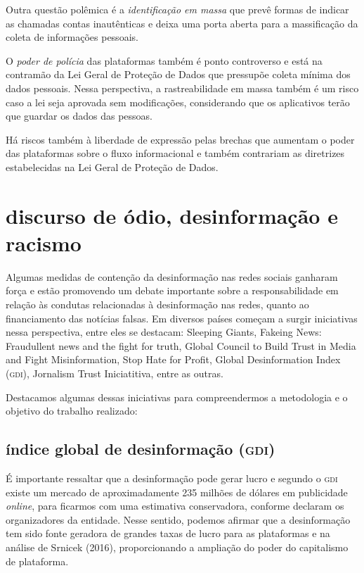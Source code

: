 Outra questão polêmica é a \textit{identificação em massa} que prevê formas de indicar as chamadas contas inautênticas e deixa uma porta aberta para a massificação da coleta de informações pessoais.

O \textit{poder de polícia} das plataformas também é ponto controverso e está na contramão da Lei Geral de Proteção de Dados que pressupõe coleta mínima dos dados pessoais. Nessa perspectiva, a rastreabilidade em massa também é um risco caso a lei seja aprovada sem modificações, considerando que os aplicativos terão que guardar os dados das pessoas.

Há riscos também à liberdade de expressão pelas brechas que aumentam o poder das plataformas sobre o fluxo informacional e também contrariam as diretrizes estabelecidas na Lei Geral de Proteção de Dados.

\section{discurso de ódio, desinformação e racismo}

Algumas medidas de contenção da desinformação nas redes sociais ganharam
força e estão promovendo um debate importante sobre a responsabilidade
em relação às condutas relacionadas à desinformação nas redes, quanto ao
financiamento das notícias falsas. Em diversos países começam a surgir
iniciativas nessa perspectiva, entre eles se destacam: Sleeping Giants,
Fakeing News: Fraudullent news and the fight for truth, Global Council
to Build Trust in Media and Fight Misinformation, Stop Hate for Profit, Global Desinformation Index (\textsc{gdi}), Jornalism Trust Iniciatitiva, entre
as outras.

Destacamos algumas dessas iniciativas para compreendermos a metodologia
e o objetivo do trabalho realizado:

\subsection{índice global de desinformação (\textsc{gdi})}

É importante ressaltar que a desinformação pode gerar lucro e segundo o
\textsc{gdi} existe um mercado de
aproximadamente 235 milhões de dólares em publicidade \textit{online}, para ficarmos
com uma estimativa conservadora, conforme declaram os organizadores da
entidade. Nesse sentido, podemos afirmar que a desinformação tem sido
fonte geradora de grandes taxas de lucro para as plataformas e na
análise de Srnicek (2016), proporcionando a ampliação do poder do
capitalismo de plataforma.

